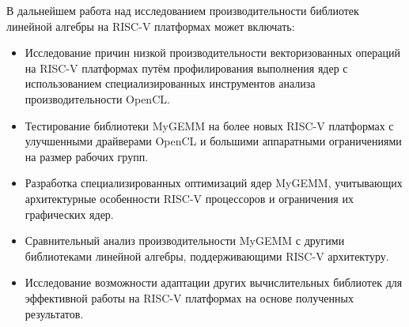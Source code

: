 В дальнейшем работа над исследованием производительности библиотек линейной алгебры на RISC-V платформах может включать:

\begin{itemize}
    \item Исследование причин низкой производительности векторизованных операций на RISC-V платформах путём профилирования выполнения ядер с использованием специализированных инструментов анализа производительности OpenCL.
    
    \item Тестирование библиотеки MyGEMM на более новых RISC-V платформах с улучшенными драйверами OpenCL и большими аппаратными ограничениями на размер рабочих групп.
    
    \item Разработка специализированных оптимизаций ядер MyGEMM, учитывающих архитектурные особенности RISC-V процессоров и ограничения их графических ядер.
    
    \item Сравнительный анализ производительности MyGEMM с другими библиотеками линейной алгебры, поддерживающими RISC-V архитектуру.
    
    \item Исследование возможности адаптации других вычислительных библиотек для эффективной работы на RISC-V платформах на основе полученных результатов.
\end{itemize}